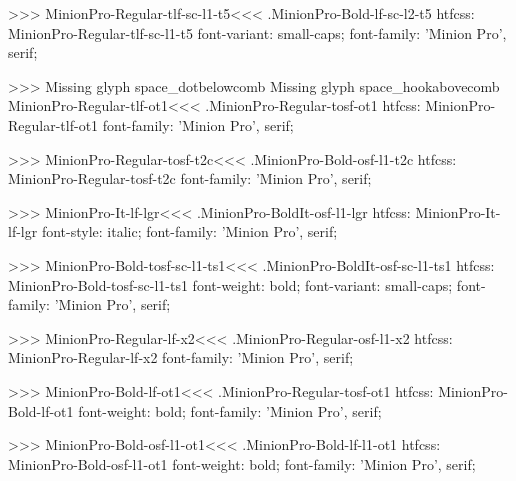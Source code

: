 {>>>
\<MinionPro-Regular-tlf-sc-l1-t5\><<<
.MinionPro-Bold-lf-sc-l2-t5
htfcss:  MinionPro-Regular-tlf-sc-l1-t5  font-variant: small-caps; font-family: 'Minion Pro', serif;

>>>
Missing glyph	space_dotbelowcomb
Missing glyph	space_hookabovecomb
\<MinionPro-Regular-tlf-ot1\><<<
.MinionPro-Regular-tosf-ot1
htfcss:  MinionPro-Regular-tlf-ot1  font-family: 'Minion Pro', serif;

>>>
\<MinionPro-Regular-tosf-t2c\><<<
.MinionPro-Bold-osf-l1-t2c
htfcss:  MinionPro-Regular-tosf-t2c  font-family: 'Minion Pro', serif;

>>>
\<MinionPro-It-lf-lgr\><<<
.MinionPro-BoldIt-osf-l1-lgr
htfcss:  MinionPro-It-lf-lgr  font-style: italic; font-family: 'Minion Pro', serif;

>>>
\<MinionPro-Bold-tosf-sc-l1-ts1\><<<
.MinionPro-BoldIt-osf-sc-l1-ts1
htfcss:  MinionPro-Bold-tosf-sc-l1-ts1  font-weight: bold; font-variant: small-caps; font-family: 'Minion Pro', serif;

>>>
\<MinionPro-Regular-lf-x2\><<<
.MinionPro-Regular-osf-l1-x2
htfcss:  MinionPro-Regular-lf-x2  font-family: 'Minion Pro', serif;

>>>
\<MinionPro-Bold-lf-ot1\><<<
.MinionPro-Regular-tosf-ot1
htfcss:  MinionPro-Bold-lf-ot1  font-weight: bold; font-family: 'Minion Pro', serif;

>>>
\<MinionPro-Bold-osf-l1-ot1\><<<
.MinionPro-Bold-lf-l1-ot1
htfcss:  MinionPro-Bold-osf-l1-ot1  font-weight: bold; font-family: 'Minion Pro', serif;

}
